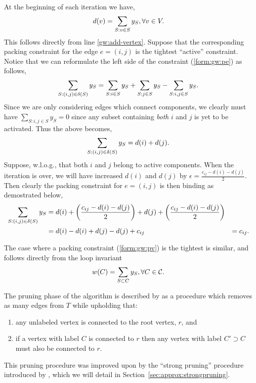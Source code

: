  At the beginning of each iteration we have,
 \[d(v) = \sum_{S: v \in S} y_S, \forall v \in V \mathnormal{.}\]
 This follows directly from line \ref{gw:add-vertex}. Suppose that the corresponding
 packing constraint for the edge $e = (i,j)$ is
  the tightest ``active'' constraint. Notice that we can reformulate the left side of the constraint (\ref{form:gw:pe}) as follows,
 \[\sum_{S: (i,j) \in \delta(S)} y_S = \sum_{S : i \in S} y_S + \sum_{S : j \in S} y_S - \sum_{S : i,j \in S} y_S\mathnormal{.}\]
 Since we are only considering edges which connect components, we clearly must have $\sum_{S : i,j \in S} y_S = 0$
 since any subset containing \textit{both} $i$ and $j$ is yet to be activated.
 Thus the above becomes,
 \[\sum_{S: (i,j) \in \delta(S)} y_S = d(i) + d(j)\mathnormal{.}\]
 Suppose, w.l.o.g., that both $i$ and $j$ belong to active components.
 When the iteration is over, we will have increased $d(i)$ and $d(j)$ by $\epsilon = \frac{c_{ij} - d(i) - d(j)}{2}$.
 Then clearly the packing constraint for $e = (i,j)$ is then binding as demostrated below,
 \begin{align*}
\sum_{S: (i,j) \in \delta(S)} y_S &= d(i) + \left( \frac{c_{ij} - d(i) - d(j)}{2} \right) + d(j) +
                                    \left( \frac{c_{ij} - d(i) - d(j)}{2} \right) \\
                              &= d(i) - d(i) + d(j) - d(j) + c_{ij}
                                    &= c_{ij}\mathnormal{.}
 \end{align*}

 The case where a packing constraint (\ref{form:gw:pv}) is the tightest is similar, and follows directly from the loop
 invariant
 \[w(C) = \sum_{S \subset C} y_S, \forall C \in \mathcal{C}\mathnormal{.}\]

 The pruning phase of the algorithm is described by \citet{goemans1995general}
 as a procedure which removes as many
 edges from $T$ while upholding that:
 \begin{enumerate}
 \item any unlabeled vertex is connected to the root vertex, $r$, and
 \item if a vertex with label $C$ is connected to $r$ then any vertex with
   label $C' \supset C$ must also be connected to $r$.
 \end{enumerate}
 This pruning procedure was improved upon by the ``strong pruning'' procedure introduced by \citet{Johnson:2000:PCS:338219.338637},
  which we will detail in Section~\ref{sec:approx:strongpruning}.
